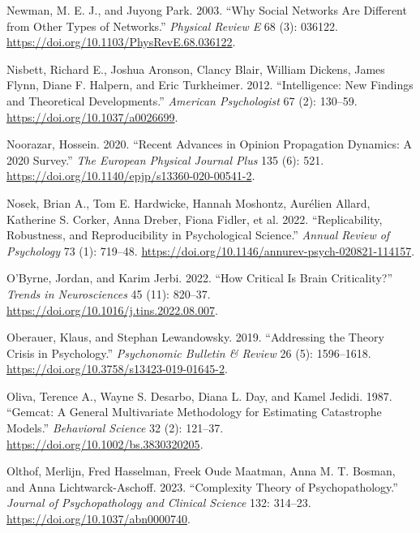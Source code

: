 \documentclass[
  a4paper,
  DIV=11,
  numbers=noendperiod,
  oneside]{scrreprt}
\newlength{\cslhangindent}
\newenvironment{CSLReferences}[2] %
 {\begin{list}{}{%
  \setlength{\itemindent}{0pt}
  \setlength{\leftmargin}{0pt}
  \setlength{\parsep}{0pt}
  \ifodd #1
   \setlength{\leftmargin}{\cslhangindent}
   \setlength{\itemindent}{-1\cslhangindent}
  \fi
  \setlength{\itemsep}{#2\baselineskip}}}
 {\end{list}}
\begin{document}
\begin{CSLReferences}{1}{0}
Newman, M. E. J., and Juyong Park. 2003. {``Why Social Networks Are
Different from Other Types of Networks.''} \emph{Physical Review E} 68
(3): 036122. \url{https://doi.org/10.1103/PhysRevE.68.036122}.

Nisbett, Richard E., Joshua Aronson, Clancy Blair, William Dickens,
James Flynn, Diane F. Halpern, and Eric Turkheimer. 2012.
{``Intelligence: New Findings and Theoretical Developments.''}
\emph{American Psychologist} 67 (2): 130--59.
\url{https://doi.org/10.1037/a0026699}.

Noorazar, Hossein. 2020. {``Recent Advances in Opinion Propagation
Dynamics: A 2020 Survey.''} \emph{The European Physical Journal Plus}
135 (6): 521. \url{https://doi.org/10.1140/epjp/s13360-020-00541-2}.

Nosek, Brian A., Tom E. Hardwicke, Hannah Moshontz, Aurélien Allard,
Katherine S. Corker, Anna Dreber, Fiona Fidler, et al. 2022.
{``Replicability, {Robustness}, and {Reproducibility} in {Psychological
Science}.''} \emph{Annual Review of Psychology} 73 (1): 719--48.
\url{https://doi.org/10.1146/annurev-psych-020821-114157}.

O'Byrne, Jordan, and Karim Jerbi. 2022. {``How Critical Is Brain
Criticality?''} \emph{Trends in Neurosciences} 45 (11): 820--37.
\url{https://doi.org/10.1016/j.tins.2022.08.007}.

Oberauer, Klaus, and Stephan Lewandowsky. 2019. {``Addressing the Theory
Crisis in Psychology.''} \emph{Psychonomic Bulletin \& Review} 26 (5):
1596--1618. \url{https://doi.org/10.3758/s13423-019-01645-2}.

Oliva, Terence A., Wayne S. Desarbo, Diana L. Day, and Kamel Jedidi.
1987. {``Gemcat: {A} General Multivariate Methodology for Estimating
Catastrophe Models.''} \emph{Behavioral Science} 32 (2): 121--37.
\url{https://doi.org/10.1002/bs.3830320205}.

Olthof, Merlijn, Fred Hasselman, Freek Oude Maatman, Anna M. T. Bosman,
and Anna Lichtwarck-Aschoff. 2023. {``Complexity Theory of
Psychopathology.''} \emph{Journal of Psychopathology and Clinical
Science} 132: 314--23. \url{https://doi.org/10.1037/abn0000740}.


\end{CSLReferences}
\end{document}
